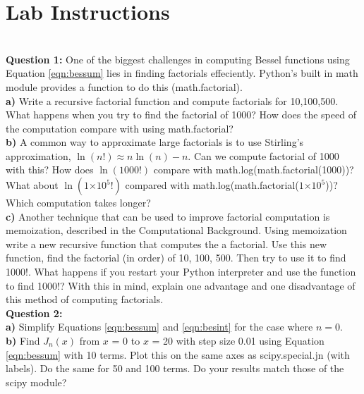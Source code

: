 \documentclass[a4paper,12pt]{article}
\providecommand{\e}[1]{\ensuremath{\times 10^{#1}}}
\begin{document}
\section{Lab Instructions}
\\
\textbf{Question 1:} One of the biggest challenges in computing Bessel functions using Equation \ref{eqn:bessum} lies in finding factorials effeciently. Python's built in math module provides a function to do this (math.factorial).\\
\textbf{a)} Write a recursive factorial function and compute factorials for 10,100,500. What happens when you try to find the factorial of 1000? How does the speed of the computation compare with using math.factorial?\\
\textbf{b)} A common way to approximate large factorials is to use Stirling's approximation, $\ln(n!) \approx n\ln(n) - n$. Can we compute factorial of 1000 with this? How does $\ln(1000!)$ compare with math.log(math.factorial(1000))? What about $\ln(1\e{5}!)$ compared with math.log(math.factorial($1\e{5}$))? Which computation takes longer?\\
\textbf{c)} Another technique that can be used to improve factorial computation is memoization, described in the Computational Background. Using memoization write a new recursive function that computes the a factorial. Use this new function, find the factorial (in order) of 10, 100, 500. Then try to use it to find 1000!. What happens if you restart your Python interpreter and use the function to find 1000!? With this in mind, explain one advantage and one disadvantage of this method of computing factorials. \\

\textbf{Question 2:} \\
\textbf{a)} Simplify Equations \ref{eqn:bessum} and \ref{eqn:besint} for the case where $n = 0$.\\
\textbf{b)} Find $J_n(x)$ from $x$ = 0 to $x$ = 20 with step size 0.01 using Equation \ref{eqn:bessum} with 10 terms. Plot this on the same axes as scipy.special.jn (with labels). Do the same for 50 and 100 terms. Do your results match those of the scipy module?\\
\end{document}
